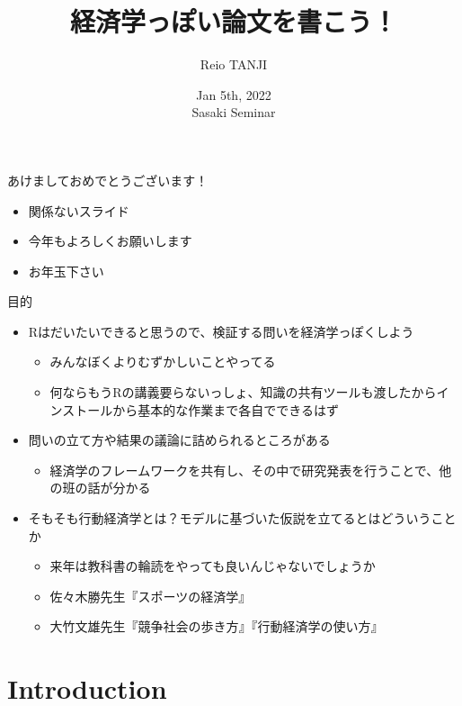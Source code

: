 \documentclass[dvipdfmx,11pt]{beamer}
\title[お年玉下さい]{経済学っぽい論文を書こう！}
\subtitle{}
\author{Reio TANJI}
\date{Jan 5th, 2022 \\ Sasaki Seminar}
\institute[OU Graduate School of Economics]{Osaka University, Graduate School of Economics}
\begin{document}
\begin{frame}\frametitle{}
\titlepage
\end{frame}

\begin{frame}{あけましておめでとうございます！}
  \begin{itemize}
    \item 関係ないスライド
    \item 今年もよろしくお願いします
    \item お年玉下さい
  \end{itemize}
\end{frame}

\begin{frame}{目的}
  \begin{itemize}
    \item Rはだいたいできると思うので、検証する問いを経済学っぽくしよう
    \begin{itemize}
      \item みんなぼくよりむずかしいことやってる
      \item 何ならもうRの講義要らないっしょ、知識の共有ツールも渡したからインストールから基本的な作業まで各自でできるはず
    \end{itemize}
    \item 問いの立て方や結果の議論に詰められるところがある
    \begin{itemize}
      \item 経済学のフレームワークを共有し、その中で研究発表を行うことで、他の班の話が分かる
    \end{itemize}
    \item そもそも行動経済学とは？モデルに基づいた仮説を立てるとはどういうことか
    \begin{itemize}
      \item 来年は教科書の輪読をやっても良いんじゃないでしょうか
      \item 佐々木勝先生『スポーツの経済学』
      \item 大竹文雄先生『競争社会の歩き方』『行動経済学の使い方』
    \end{itemize}
  \end{itemize}
\end{frame}

\section{Introduction}
\frame{\sectionpage}
\end{document}
